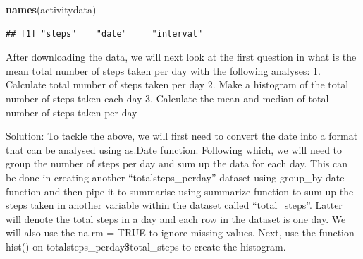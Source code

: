 \documentclass[
]{article}
\newenvironment{Shaded}{\begin{snugshade}}{\end{snugshade}}
\newcommand{\FunctionTok}[1]{\textcolor[rgb]{0.13,0.29,0.53}{\textbf{#1}}}
\newcommand{\NormalTok}[1]{#1}
\begin{document}
\begin{Shaded}
\begin{Highlighting}[]
\FunctionTok{names}\NormalTok{(activitydata)}
\end{Highlighting}
\end{Shaded}

\begin{verbatim}
## [1] "steps"    "date"     "interval"
\end{verbatim}

After downloading the data, we will next look at the first question in
what is the mean total number of steps taken per day with the following
analyses: 1. Calculate total number of steps taken per day 2. Make a
histogram of the total number of steps taken each day 3. Calculate the
mean and median of total number of steps taken per day

Solution: To tackle the above, we will first need to convert the date
into a format that can be analysed using as.Date function. Following
which, we will need to group the number of steps per day and sum up the
data for each day. This can be done in creating another
``totalsteps\_perday'' dataset using group\_by date function and then
pipe it to summarise using summarize function to sum up the steps taken
in another variable within the dataset called ``total\_steps''. Latter
will denote the total steps in a day and each row in the dataset is one
day. We will also use the na.rm = TRUE to ignore missing values. Next,
use the function hist() on totalsteps\_perday\$total\_steps to create
the histogram.
\end{document}
